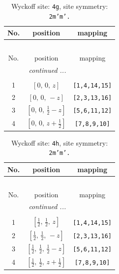 \documentclass[fleqn,8pt]{jsarticle}
\begin{document}
\begin{longtable}{ccc}
\caption{Wyckoff site: {\tt 4g}, site symmetry: {\tt 2m'm'.}}
 \\
 \hline \hline
No. & position & mapping \\ \hline \endfirsthead

\multicolumn{2}{l}{\tablename\ \thetable{}} \\
 \hline \hline
No. & position & mapping \\ \hline \endhead

 \hline \hline
\multicolumn{2}{r}{\footnotesize\it continued ...} \\ \endfoot

 \hline \hline
\multicolumn{2}{r}{} \\ \endlastfoot

1 & $\left[ 0,\, 0,\, z \right]$ & {\tt [1,4,14,15]} \\ \hline
2 & $\left[ 0,\, 0,\, - z \right]$ & {\tt [2,3,13,16]} \\ \hline
3 & $\left[ 0,\, 0,\, \frac{1}{2} - z \right]$ & {\tt [5,6,11,12]} \\ \hline
4 & $\left[ 0,\, 0,\, z + \frac{1}{2} \right]$ & {\tt [7,8,9,10]} \\
\end{longtable}
\renewcommand{\arraystretch}{1.2}
\begin{longtable}{ccc}
\caption{Wyckoff site: {\tt 4h}, site symmetry: {\tt 2m'm'.}}
 \\
 \hline \hline
No. & position & mapping \\ \hline \endfirsthead

\multicolumn{2}{l}{\tablename\ \thetable{}} \\
 \hline \hline
No. & position & mapping \\ \hline \endhead

 \hline \hline
\multicolumn{2}{r}{\footnotesize\it continued ...} \\ \endfoot

 \hline \hline
\multicolumn{2}{r}{} \\ \endlastfoot

1 & $\left[ \frac{1}{2},\, \frac{1}{2},\, z \right]$ & {\tt [1,4,14,15]} \\ \hline
2 & $\left[ \frac{1}{2},\, \frac{1}{2},\, - z \right]$ & {\tt [2,3,13,16]} \\ \hline
3 & $\left[ \frac{1}{2},\, \frac{1}{2},\, \frac{1}{2} - z \right]$ & {\tt [5,6,11,12]} \\ \hline
4 & $\left[ \frac{1}{2},\, \frac{1}{2},\, z + \frac{1}{2} \right]$ & {\tt [7,8,9,10]} \\
\end{longtable}
\end{document}
